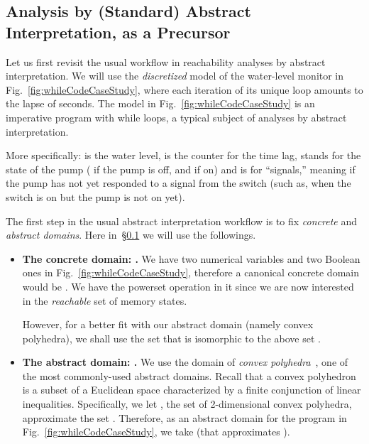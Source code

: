 \documentclass[envcountsect,orivec]{llncs} \pdfoutput=1
\theoremstyle{definition}
\begin{document}
\subsection{Analysis by (Standard) Abstract Interpretation, as a Precursor}\label{subsec:waterLevel0.2}
Let us first revisit the usual workflow in reachability analyses by
abstract interpretation.
We will use the \emph{discretized} model of the water-level monitor
 in Fig.~\ref{fig:whileCodeCaseStudy}, where each iteration of its unique
loop amounts to the lapse of  seconds. The model in
Fig.~\ref{fig:whileCodeCaseStudy} is an imperative program
with while loops, a typical subject of analyses by abstract
interpretation. 

More specifically:
 is the water level,  is the counter for the time lag,
 stands for  the state of the pump 
 ( if the pump is off, and  if on) 
and  is for ``signals,'' 
meaning  if the pump has not yet responded to a signal from the
 switch (such as, when the switch is on but the pump is not on yet). 







The first step in the usual abstract interpretation workflow is 
to fix \emph{concrete} and \emph{abstract domains}. Here in~\S\ref{subsec:waterLevel0.2} we will use the followings.
\begin{itemize}
 \item \textbf{The concrete domain: .} 
       We have two numerical variables  and two Boolean ones 
       in Fig.~\ref{fig:whileCodeCaseStudy},
       therefore a canonical concrete domain would be . We have the powerset operation  in it since we
       are now interested in the \emph{reachable} set of memory states.

       However, for a better fit with our abstract domain  (namely
       convex polyhedra), we shall use the set
        that is isomorphic to the above set
.

\item \textbf{The abstract domain: .} 
 We use the domain of \emph{convex polyhedra}~\cite{Cousot1978},
       one of the most commonly-used abstract domains. 
       Recall that a convex polyhedron is a subset of a Euclidean space
       characterized by a finite conjunction of linear inequalities. 
       Specifically, we
       let , the set of 2-dimensional convex polyhedra, 
       approximate the set . Therefore, as an abstract
       domain for the program in Fig.~\ref{fig:whileCodeCaseStudy}, 
       we 
       take  (that approximates
       ). 

\end{itemize}
\end{document}
